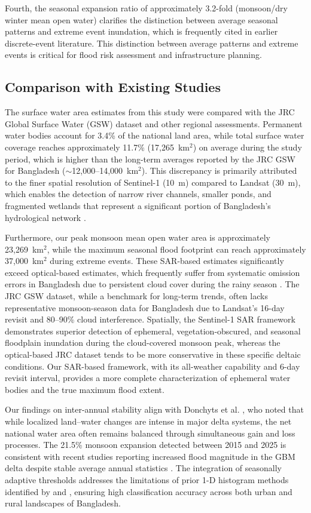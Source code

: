 \documentclass[fleqn,10pt]{article}
\begin{document}
Fourth, the seasonal expansion ratio of approximately 3.2-fold (monsoon/dry winter mean open water) clarifies the distinction between average seasonal patterns and extreme event inundation, which is frequently cited in earlier discrete-event literature. This distinction between average patterns and extreme events is critical for flood risk assessment and infrastructure planning.

\subsection{Comparison with Existing Studies}
The surface water area estimates from this study were compared with the JRC Global Surface Water (GSW) dataset \cite{pekel2016} and other regional assessments. Permanent water bodies account for 3.4\% of the national land area, while total surface water coverage reaches approximately 11.7\% (17,265~km$^2$) on average during the study period, which is higher than the long-term averages reported by the JRC GSW for Bangladesh ($\sim$12,000--14,000~km$^2$). This discrepancy is primarily attributed to the finer spatial resolution of Sentinel-1 (10~m) compared to Landsat (30~m), which enables the detection of narrow river channels, smaller ponds, and fragmented wetlands that represent a significant portion of Bangladesh's hydrological network \cite{yamazaki2015, chignell2015}.

Furthermore, our peak monsoon mean open water area is approximately 23,269~km$^2$, while the maximum seasonal flood footprint can reach approximately 37,000~km$^2$ during extreme events. These SAR-based estimates significantly exceed optical-based estimates, which frequently suffer from systematic omission errors in Bangladesh due to persistent cloud cover during the rainy season \cite{uddin2019, ticehurst2019}. The JRC GSW dataset, while a benchmark for long-term trends, often lacks representative monsoon-season data for Bangladesh due to Landsat's 16-day revisit and 80--90\% cloud interference. Spatially, the Sentinel-1 SAR framework demonstrates superior detection of ephemeral, vegetation-obscured, and seasonal floodplain inundation during the cloud-covered monsoon peak, whereas the optical-based JRC dataset tends to be more conservative in these specific deltaic conditions. Our SAR-based framework, with its all-weather capability and 6-day revisit interval, provides a more complete characterization of ephemeral water bodies and the true maximum flood extent.

Our findings on inter-annual stability align with Donchyts et al. \cite{donchyts2016}, who noted that while localized land--water changes are intense in major delta systems, the net national water area often remains balanced through simultaneous gain and loss processes. The 21.5\% monsoon expansion detected between 2015 and 2025 is consistent with recent studies reporting increased flood magnitude in the GBM delta despite stable average annual statistics \cite{das2023, sayed2023}. The integration of seasonally adaptive thresholds addresses the limitations of prior 1-D histogram methods identified by \cite{martinis2009} and \cite{ticehurst2019}, ensuring high classification accuracy across both urban and rural landscapes of Bangladesh.
\end{document}
